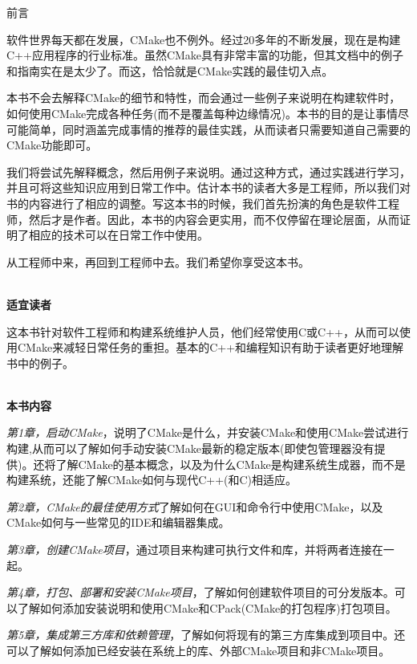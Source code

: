\begin{flushright}
	 前言
\end{flushright}

软件世界每天都在发展，CMake也不例外。经过20多年的不断发展，现在是构建C++应用程序的行业标准。虽然CMake具有非常丰富的功能，但其文档中的例子和指南实在是太少了。而这，恰恰就是CMake实践的最佳切入点。

本书不会去解释CMake的细节和特性，而会通过一些例子来说明在构建软件时，如何使用CMake完成各种任务(而不是覆盖每种边缘情况)。本书的目的是让事情尽可能简单，同时涵盖完成事情的推荐的最佳实践，从而读者只需要知道自己需要的CMake功能即可。

我们将尝试先解释概念，然后用例子来说明。通过这种方式，通过实践进行学习，并且可将这些知识应用到日常工作中。估计本书的读者大多是工程师，所以我们对书的内容进行了相应的调整。写这本书的时候，我们首先扮演的角色是软件工程师，然后才是作者。因此，本书的内容会更实用，而不仅停留在理论层面，从而证明了相应的技术可以在日常工作中使用。

从工程师中来，再回到工程师中去。我们希望你享受这本书。

\hspace*{\fill} \\ %
\textbf{适宜读者}

这本书针对软件工程师和构建系统维护人员，他们经常使用C或C++，从而可以使用CMake来减轻日常任务的重担。基本的C++和编程知识有助于读者更好地理解书中的例子。

\hspace*{\fill} \\ %
\textbf{本书内容}

\textit{第1章，启动CMake}，说明了CMake是什么，并安装CMake和使用CMake尝试进行构建,从而可以了解如何手动安装CMake最新的稳定版本(即使包管理器没有提供)。还将了解CMake的基本概念，以及为什么CMake是构建系统生成器，而不是构建系统，还能了解CMake如何与现代C++(和C)相适应。

\textit{第2章，CMake的最佳使用方式}了解如何在GUI和命令行中使用CMake，以及CMake如何与一些常见的IDE和编辑器集成。

\textit{第3章，创建CMake项目}，通过项目来构建可执行文件和库，并将两者连接在一起。

\textit{第4章，打包、部署和安装CMake项目}，了解如何创建软件项目的可分发版本。可以了解如何添加安装说明和使用CMake和CPack(CMake的打包程序)打包项目。

\textit{第5章，集成第三方库和依赖管理}，了解如何将现有的第三方库集成到项目中。还可以了解如何添加已经安装在系统上的库、外部CMake项目和非CMake项目。

